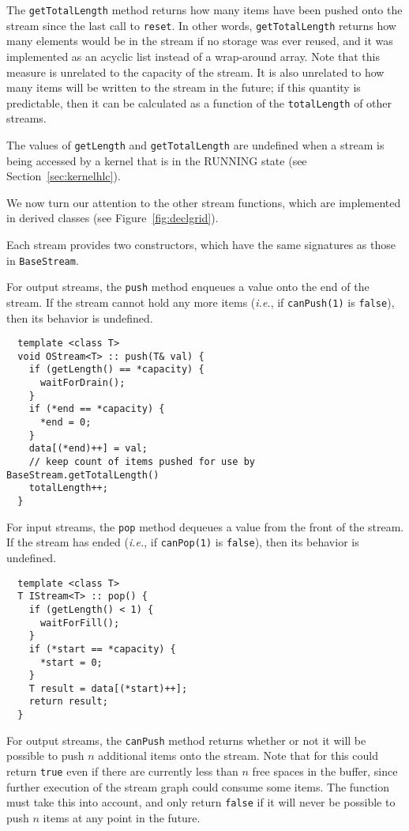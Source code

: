 The {\tt getTotalLength} method returns how many items have been
pushed onto the stream since the last call to {\tt reset}.  In other
words, {\tt getTotalLength} returns how many elements would be in the
stream if no storage was ever reused, and it was implemented as an
acyclic list instead of a wrap-around array.  Note that this measure
is unrelated to the capacity of the stream.  It is also unrelated to
how many items will be written to the stream in the future; if this
quantity is predictable, then it can be calculated as a function of
the {\tt totalLength} of other streams.

The values of {\tt getLength} and {\tt getTotalLength} are undefined
when a stream is being accessed by a kernel that is in the RUNNING
state (see Section~\ref{sec:kernelhlc}).

\newpage
{}

We now turn our attention to the other stream functions, which are
implemented in derived classes (see Figure~\ref{fig:declgrid}).

 Each stream provides two constructors, which have
the same signatures as those in {\tt BaseStream}.

 For output streams, the {\tt push} method enqueues a value
onto the end of the stream.  If the stream cannot hold any more items
({\it i.e.}, if {\tt canPush(1)} is {\tt false}), then its behavior is
undefined.

{\small
\begin{verbatim}
  template <class T>
  void OStream<T> :: push(T& val) {
    if (getLength() == *capacity) {
      waitForDrain();
    }
    if (*end == *capacity) {
      *end = 0;
    }
    data[(*end)++] = val;
    // keep count of items pushed for use by BaseStream.getTotalLength()
    totalLength++;
  }
\end{verbatim}}

 For input streams, the {\tt pop} method dequeues a value
from the front of the stream.  If the stream has ended ({\it i.e.}, if
{\tt canPop(1)} is {\tt false}), then its behavior is undefined.

{\small
\begin{verbatim}
  template <class T>
  T IStream<T> :: pop() {
    if (getLength() < 1) {
      waitForFill();
    }
    if (*start == *capacity) {
      *start = 0;
    }
    T result = data[(*start)++];
    return result;
  }
\end{verbatim}}

 For output streams, the {\tt canPush} method returns
whether or not it will be possible to push $n$ additional items onto
the stream.  Note that for this could return {\tt true} even if there
are currently less than $n$ free spaces in the buffer, since further
execution of the stream graph could consume some items.  The function
must take this into account, and only return {\tt false} if it will
never be possible to push $n$ items at any point in the future.

